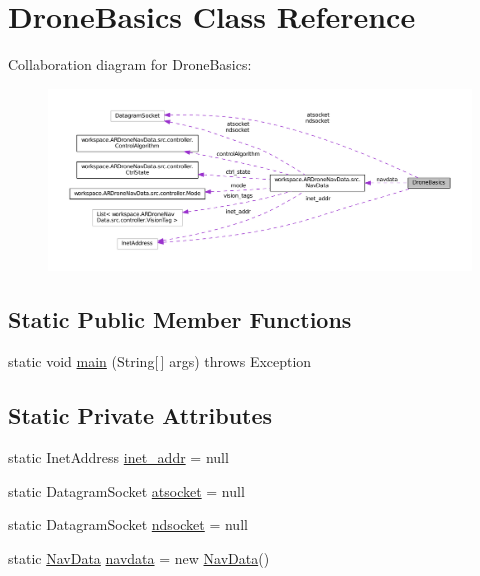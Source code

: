 \hypertarget{class_drone_basics}{}\section{Drone\+Basics Class Reference}
\label{class_drone_basics}


Collaboration diagram for Drone\+Basics\+:\nopagebreak
\begin{figure}[H]
\begin{center}
\leavevmode
\includegraphics[width=350pt]{class_drone_basics__coll__graph}
\end{center}
\end{figure}
\subsection*{Static Public Member Functions}
\begin{DoxyCompactItemize}
\item 
static void \hyperlink{class_drone_basics_ae54854dcdd8fd3b84b1094fcd26a8954}{main} (String\mbox{[}$\,$\mbox{]} args)  throws Exception 	
\end{DoxyCompactItemize}
\subsection*{Static Private Attributes}
\begin{DoxyCompactItemize}
\item 
static Inet\+Address \hyperlink{class_drone_basics_af9aed89eb6bf900c469b8e2dd8a0ba54}{inet\+\_\+addr} = null
\item 
static Datagram\+Socket \hyperlink{class_drone_basics_adde72319658ee9fcad5d4266cf6c3ec8}{atsocket} = null
\item 
static Datagram\+Socket \hyperlink{class_drone_basics_a7257f257caa0bb8890ec9b866dad5fdc}{ndsocket} = null
\item 
static \hyperlink{classworkspace_1_1_a_r_drone_nav_data_1_1src_1_1_nav_data}{Nav\+Data} \hyperlink{class_drone_basics_a3417fe356d9cd027e60d0e2ded680bfd}{navdata} = new \hyperlink{classworkspace_1_1_a_r_drone_nav_data_1_1src_1_1_nav_data}{Nav\+Data}()
\end{DoxyCompactItemize}


